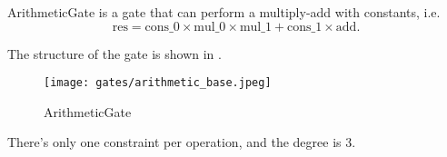 
\hspace*{\fill}

\indent ArithmeticGate is a gate that can perform a multiply-add with constants, i.e.
\[ \text{res} = \text{cons\_0} \times \text{mul\_0} \times \text{mul\_1} + \text{cons\_1} \times \text{add}. \]

The structure of the gate is shown in .

\begin{figure}[!ht]
    \centering
    \texttt{[image: gates/arithmetic\_base.jpeg]}
    \caption{ArithmeticGate}
    \label{fig:arithmetic-gate}
\end{figure}

There's only one constraint per operation, and the degree is 3.
